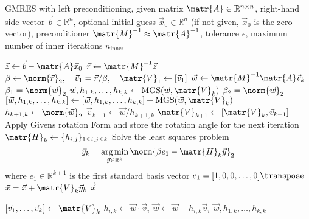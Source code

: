 \begin{singlespace}
  \begin{algorithm}[h]
    \caption{GMRES with left preconditioning, given matrix \(\matr{A} \in \mathbb{R}^{n \times
        n}\), right-hand side vector \(\vec{b} \in \mathbb{R}^n\), optional
      initial guess \(\vec{x}_0 \in \mathbb{R}^n\) (if not given, \(\vec{x}_0\)
      is the zero vector), preconditioner \(\matr{M}^{-1} \approx
      \matr{A}^{-1}\), tolerance \(\epsilon\), maximum number of inner
      iterations \(n_{\text{inner}}\)}
    \label{algo:gmres}
    \begin{algorithmic}[1]
      \State \(\vec{z} \gets \vec{b} - \matr{A}\vec{x}_0\) 
      \State \(\vec{r} \gets \matr{M}^{-1}\vec{z}\) 
      \State \(\beta \gets \norm{\vec{r}}_2, \quad \vec{v}_1 = \vec{r} / \beta, \quad \matr{V}_1 \gets [\vec{v}_1]\) 
        \State \(\vec{w} \gets \matr{M}^{-1} \matr{A} \vec{v}_k\) 
        \State \(\beta_1 = \norm{\vec{w}}_2\)
        \State \(\vec{w}, h_{1,k}, \dots, h_{k,k} \gets \text{MGS}(\vec{w}, \matr{V}_k)\) 
        \State \(\beta_2 = \norm{\vec{w}}_2\)
         
          \State \([\vec{w}, h_{1,k}, \dots, h_{k,k}] \gets [\vec{w}, h_{1,k}, \dots, h_{k,k}] +
          \text{MGS}(\vec{w}, \matr{V}_k)\) 
        \EndIf
        \State \(h_{k+1,k} \gets \norm{\vec{w}}_2\)
        \State \(\vec{v}_{k+1} \gets \vec{w} / h_{k+1,k}\)
        \State \(\matr{V}_{k+1} \gets [\matr{V}_k, \vec{v}_{k+1}]\) 
        \State Apply Givens rotation
        \State Form and store the rotation angle for the next iteration
      \EndFor
      \State \(\matr{H}_k \gets \{h_{i,j}\}_{1 \le i,j \le k}\) 
      \State Solve the least squares problem \[\vec{y}_k = \argmin_{\vec{y}\in\mathbb{R}^k} \norm{\beta e_1 - \matr{H}_k \vec{y}}_2\]
      where \(e_1 \in \mathbb{R}^{k + 1}\) is the first standard basis vector \(e_1 = [1, 0, 0, \dots, 0]\transpose\)
      \State \(\vec{x} = \vec{x} + \matr{V}_k \vec{y}_k\) 
      \State \Return \(\vec{x}\)

      \vspace{10pt}

       
        \State \([\vec{v}_1, \dots, \vec{v}_k] \gets \matr{V}_k\)
          \State \(h_{i,k} \gets \vec{w} \cdot \vec{v}_i\)
          \State \(\vec{w} \gets \vec{w} - h_{i,k} \vec{v}_i\)
        \EndFor
        \State \Return \(\vec{w}, h_{1,k}, \dots, h_{k,k}\)
      \EndProcedure
    \end{algorithmic}
  \end{algorithm}
\end{singlespace}

